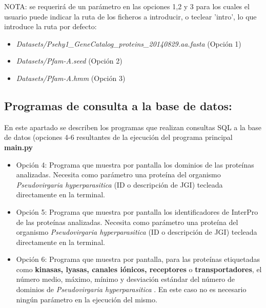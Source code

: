 \documentclass[11pt]{article} %
\begin{document}
	NOTA: se requerirá de un parámetro en las opciones 1,2 y 3 para los cuales el usuario puede indicar la ruta de los ficheros a introducir, o teclear 'intro', lo que introduce la ruta por defecto:
	
	\begin{itemize}
	
	\item \emph{Datasets/Psehy1\_GeneCatalog\_proteins\_20140829.aa.fasta} (Opción 1)
	
	\item \emph{Datasets/Pfam-A.seed} (Opción 2)
	
	\item \emph{Datasets/Pfam-A.hmm} (Opción 3)
	
	\end{itemize}
	
	\subsection{Programas de consulta a la base de datos:}
	
	En este apartado se describen los programas que realizan consultas SQL a la base de datos (opciones 4-6 resultantes de la ejecución del programa principal \textbf{main.py}

\begin{itemize}

\item Opción 4: Programa que muestra por pantalla los dominios de las proteínas analizadas. Necesita como parámetro una proteína del organismo \emph{Pseudovirgaria hyperparasitica} (ID o descripción de JGI) tecleada directamente en la terminal.

\item Opción 5: Programa que muestra por pantalla los identificadores de InterPro  de las proteínas analizadas. Necesita como parámetro una proteína del organismo \emph{Pseudovirgaria hyperparasitica} (ID o descripción de JGI) tecleada directamente en la terminal.

\item Opción 6: Programa que muestra por pantalla, para las proteínas etiquetadas como \textbf{kinasas, lyasas, canales iónicos, receptores} o \textbf{transportadores}, el número medio, máximo, mínimo y desviación estándar del número de dominios de  \emph{Pseudovirgaria hyperparasitica} . En este caso no es necesario ningún parámetro en la ejecución del mismo.

\end{itemize}
\end{document}
